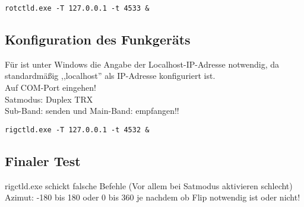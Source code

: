 \vspace{-1em}
\begin{shaded}
	\texttt{rotctld.exe -T 127.0.0.1 -t 4533 \&}
\end{shaded}
\vspace{-1em}

\subsection{Konfiguration des Funkgeräts}

Für  ist unter Windows die Angabe der Localhost-IP-Adresse notwendig, da standardmäßig ,,localhost'' als IP-Adresse konfiguriert ist.\\
Auf COM-Port eingehen!\\
Satmodus: Duplex TRX\\
Sub-Band: senden und Main-Band: empfangen!!\\

\vspace{-1em}
\begin{shaded}
	\texttt{rigctld.exe -T 127.0.0.1 -t 4532 \&}
\end{shaded}
\vspace{-1em}

\subsection{Finaler Test}

rigctld.exe schickt falsche Befehle (Vor allem bei Satmodus aktivieren schlecht)\\

Azimut: -180 bis 180 oder 0 bis 360 je nachdem ob Flip notwendig ist oder nicht!\\